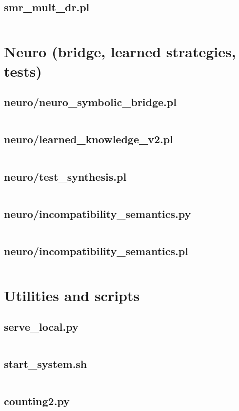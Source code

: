 \documentclass{article}
\begin{document}
\subsection{smr\_mult\_dr.pl}
\inputminted{prolog}{smr_mult_dr.pl}

\section{Neuro (bridge, learned strategies, tests)}
\subsection{neuro/neuro\_symbolic\_bridge.pl}
\inputminted{prolog}{neuro/neuro_symbolic_bridge.pl}
\subsection{neuro/learned\_knowledge\_v2.pl}
\inputminted{prolog}{neuro/learned_knowledge_v2.pl}
\subsection{neuro/test\_synthesis.pl}
\inputminted{prolog}{neuro/test_synthesis.pl}
\subsection{neuro/incompatibility\_semantics.py}
\inputminted{python}{neuro/incompatibility_semantics.py}
\subsection{neuro/incompatibility\_semantics.pl}
\inputminted{prolog}{neuro/incompatibility_semantics.pl}

\section{Utilities and scripts}
\subsection{serve\_local.py}
\inputminted{python}{serve_local.py}
\subsection{start\_system.sh}
\inputminted{bash}{start_system.sh}
\subsection{counting2.py}
\inputminted{python}{counting2.py}
\end{document}

